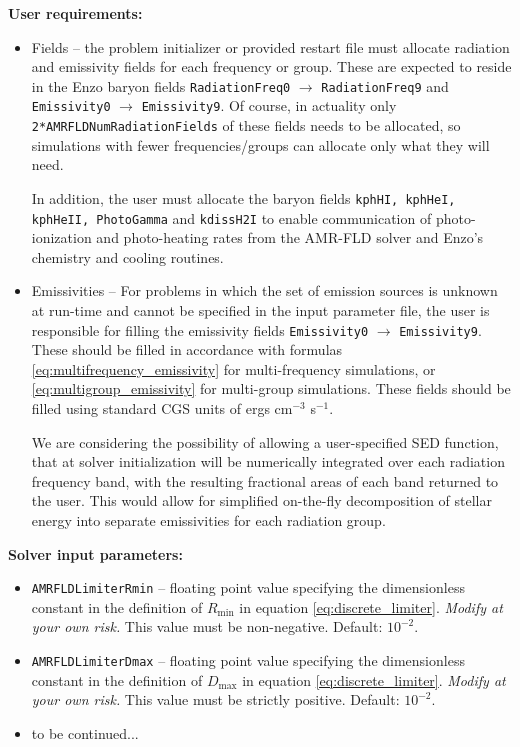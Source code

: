 \documentclass[10pt]{article}
\renewcommand{\(}{\left(}
\renewcommand{\)}{\right)}
\begin{document}
{\bf User requirements:}
\begin{itemize}
\item Fields -- the problem initializer or provided restart file must
  allocate radiation and emissivity fields for each frequency or
  group.  These are expected to reside in the Enzo baryon fields 
  {\tt RadiationFreq0} $\to$ {\tt RadiationFreq9} and {\tt Emissivity0} 
  $\to$ {\tt Emissivity9}.  Of course, in actuality only \\
  {\tt 2*AMRFLDNumRadiationFields} of these fields needs to be
  allocated, so simulations with fewer frequencies/groups can allocate
  only what they will need.

  In addition, the user must allocate the baryon fields {\tt kphHI,
  kphHeI, kphHeII, PhotoGamma} and {\tt kdissH2I} to enable communication 
  of photo-ionization and photo-heating rates from the AMR-FLD solver and 
  Enzo's chemistry and cooling routines.

\item Emissivities -- For problems in which the set of emission
  sources is unknown at run-time and cannot be specified in the input
  parameter file, the user is responsible for filling the emissivity
  fields {\tt Emissivity0} $\to$ {\tt Emissivity9}.  These should be
  filled in accordance with formulas
  \eqref{eq:multifrequency_emissivity} for multi-frequency
  simulations, or \eqref{eq:multigroup_emissivity} for multi-group
  simulations.  These fields should be filled using standard CGS units
  of ergs cm$^{-3}$ s$^{-1}$.

  We are considering the possibility of allowing a user-specified SED
  function, that at solver initialization will be numerically
  integrated over each radiation frequency band, with the resulting
  fractional areas of each band returned to the user.  This would
  allow for simplified on-the-fly decomposition of stellar energy into
  separate emissivities for each radiation group.
\end{itemize}


{\bf Solver input parameters:}
\begin{itemize}
\item {\tt AMRFLDLimiterRmin} -- floating point value specifying the
  dimensionless constant in the definition of $R_{\text{min}}$ in
  equation \eqref{eq:discrete_limiter}.  {\em Modify at your own
    risk.}  This value must be non-negative.  Default: $10^{-2}$.
\item {\tt AMRFLDLimiterDmax} -- floating point value specifying the
  dimensionless constant in the definition of $D_{\text{max}}$ in
  equation \eqref{eq:discrete_limiter}.  {\em Modify at your own
    risk.}  This value must be strictly positive.  Default: $10^{-2}$.
\item to be continued...
\end{itemize}





\end{document}
